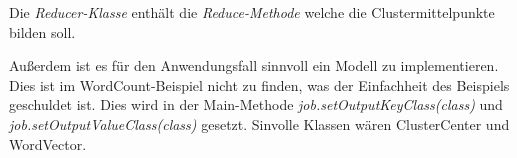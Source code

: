 Die \textit{Reducer-Klasse} enthält die \textit{Reduce-Methode} welche die Clustermittelpunkte bilden soll.

Außerdem ist es für den Anwendungsfall sinnvoll ein Modell zu implementieren. Dies ist im WordCount-Beispiel nicht zu finden, was der Einfachheit des Beispiels geschuldet ist. Dies wird in der Main-Methode 			\textit{job.setOutputKeyClass(class)} und \textit{job.setOutputValueClass(class)} gesetzt. Sinvolle Klassen wären ClusterCenter und WordVector.
